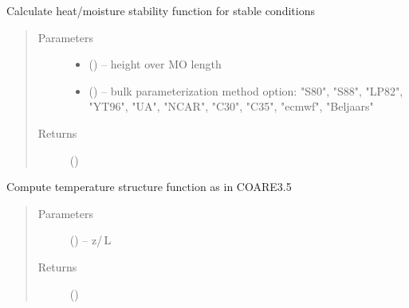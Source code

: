 \documentclass[letterpaper,10pt,english]{sphinxmanual}
\begin{document}
\begin{fulllineitems}
\label{\detokenize{index:flux_subs.psi_stab}}
Calculate heat/moisture stability function for stable conditions
\begin{quote}\begin{description}
\item[{Parameters}] \leavevmode\begin{itemize}
\item {} 
 (\href{https://docs.python.org/3/library/functions.html\#float}{}) -- height over MO length

\item {} 
 (\href{https://docs.python.org/3/library/stdtypes.html\#str}{}) -- bulk parameterization method option: "S80", "S88", "LP82", "YT96", "UA", "NCAR", "C30", "C35", "ecmwf", "Beljaars"

\end{itemize}

\item[{Returns}] \leavevmode
{} (\href{https://docs.python.org/3/library/functions.html\#float}{})

\end{description}\end{quote}

\end{fulllineitems}


\begin{fulllineitems}
\label{\detokenize{index:flux_subs.psit_26}}
Compute temperature structure function as in COARE3.5 \citep{Fairall_etal_1996a}
\begin{quote}\begin{description}
\item[{Parameters}] \leavevmode
{} (\href{https://docs.python.org/3/library/functions.html\#float}{}) -- z\slash\,L

\item[{Returns}] \leavevmode
{} (\href{https://docs.python.org/3/library/functions.html\#float}{})

\end{description}\end{quote}

\end{fulllineitems}
\end{document}
